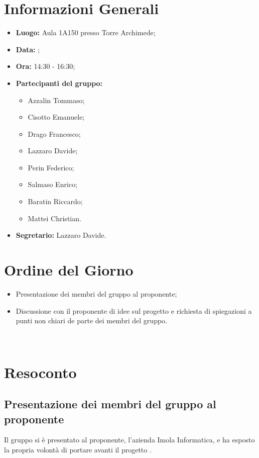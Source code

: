\section{Informazioni Generali}
\begin{itemize}
\item \textbf{Luogo:} Aula 1A150 presso Torre Archimede;
\item \textbf{Data:} \Data;
\item \textbf{Ora:} 14:30 - 16:30;
\item \textbf{Partecipanti del gruppo:}
	\begin{itemize}
	\item Azzalin Tommaso; 
	\item Cisotto Emanuele; 
	\item Drago Francesco;
	\item Lazzaro Davide;
	\item Perin Federico;
	\item Salmaso Enrico;
	\item Baratin Riccardo;
	\item Mattei Christian.
	\end{itemize} 
\item \textbf{Segretario:} Lazzaro Davide.
\end{itemize}

\clearpage

\section{Ordine del Giorno}
\begin{itemize}
	\item Presentazione dei membri del gruppo al proponente;
	\item Discussione con il proponente di idee sul progetto e richiesta di spiegazioni a punti non chiari de parte dei membri del gruppo.
\end{itemize}

~\\

\section{Resoconto}
\subsection{Presentazione dei membri del gruppo al proponente}
Il gruppo si è presentato al proponente, l'azienda Imola Informatica, e ha esposto la propria volontà di portare avanti il progetto \NomeProgetto.

